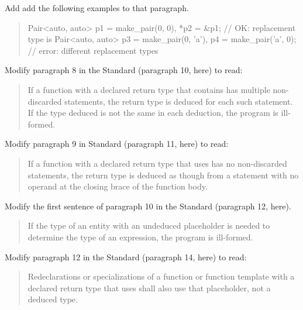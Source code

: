 Add add the following examples to that paragraph.

\begin{quote}
\enterexample
\begin{addedblock}
\begin{codeblock}
Pair<auto, auto> p1 = make_pair(0, 0), 
                 *p2 = &p1;              // OK: replacement type is 
Pair<auto, auto> p3 = make_pair(0, 'a'), 
                 p4 = make_pair('a', 0); // error: different replacement types
\end{codeblock}
\end{addedblock}
\exitexample
\end{quote}

Modify paragraph 8 in the \Cpp Standard (paragraph 10, here) to read:
\begin{quote}
\pnum
If a function with a declared return type that contains 
has multiple non-discarded  statements,
the return type is deduced for each such  statement. 
If the type deduced is not the same in each deduction,
the program is ill-formed.
\end{quote}

Modify paragraph 9 in \Cpp Standard (paragraph 11, here) to read:

\begin{quote}
\pnum
If a function with a declared return type that uses 
has no non-discarded  statements, the return type is deduced as 
though from a  statement with no operand at the closing brace of 
the function body.
\end{quote}

Modify the first sentence of paragraph 10 in the \Cpp Standard (paragraph 12,
here).

\begin{quote}
\pnum
If the type of an entity with an undeduced placeholder  
is needed to determine the type of an expression, the program is 
ill-formed.
\end{quote}

Modify paragraph 12 in the \Cpp Standard (paragraph 14, here) to read:

\begin{quote}
\setcounter{Paras}{13}
\pnum
Redeclarations or specializations of a function or function template 
with a declared return type that uses 
 shall also use that placeholder, 
not a deduced type.
% 
\end{quote}

